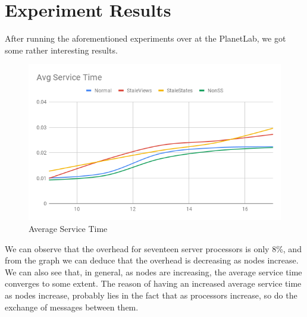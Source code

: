 \documentclass[12pt,a4paper]{report}
\begin{document}
    		
		\section{Experiment Results}
		After running the aforementioned experiments over at the PlanetLab, we got some rather interesting results. 
		
		\begin{figure}
		    \centering
		    \includegraphics[scale = 0.7]{ade/AvgServiceTime.png}
		    \caption{Average Service Time}
		    \label{fig:servicetime}
		\end{figure}
		
		 We can observe that the overhead for seventeen server processors is only 8\%, and from the graph we can deduce that the overhead is decreasing as nodes increase. We can also see that, in general, as nodes are increasing, the average service time converges to some extent.
		The reason of having an increased average service time as nodes increase, probably lies in the fact that as processors increase, so do the exchange of messages between them.
		
\end{document}
